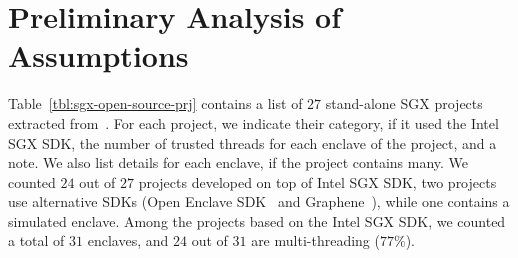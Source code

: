 \chapter{Preliminary Analysis of Assumptions}
\label{app:preliminary-analysis-assumptions}

Table~\ref{tbl:sgx-open-source-prj} contains a list of $27$ stand-alone SGX
projects extracted from~\cite{asop}.
For each project, we indicate their category, 
if it used the Intel SGX SDK,
the number of trusted threads for each 
enclave of the project, and a note.
We also list details for each enclave, if the project contains many.
We counted $24$ out of $27$ projects developed on top of Intel SGX SDK, two 
projects use alternative SDKs (\ie Open Enclave SDK~\cite{openenclave} and
Graphene~\cite{203255}), while one contains a simulated enclave.
Among the projects based on the Intel SGX SDK, we counted a total of $31$ 
enclaves, and $24$ out of $31$ are multi-threading ($77\%$).


